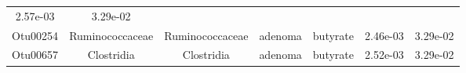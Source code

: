 \documentclass[11pt,]{article}
\begin{document}
\begin{longtable}[]{@{}ccccccc@{}}
\begin{minipage}[t]{0.09\columnwidth}
2.57e-03\strut
\end{minipage} & \begin{minipage}[t]{0.09\columnwidth}\centering\strut
3.29e-02\strut
\end{minipage}\tabularnewline
\begin{minipage}[t]{0.09\columnwidth}\centering\strut
Otu00254\strut
\end{minipage} & \begin{minipage}[t]{0.17\columnwidth}\centering\strut
Ruminococcaceae\strut
\end{minipage} & \begin{minipage}[t]{0.17\columnwidth}\centering\strut
Ruminococcaceae\strut
\end{minipage} & \begin{minipage}[t]{0.09\columnwidth}\centering\strut
adenoma\strut
\end{minipage} & \begin{minipage}[t]{0.11\columnwidth}\centering\strut
butyrate\strut
\end{minipage} & \begin{minipage}[t]{0.09\columnwidth}\centering\strut
2.46e-03\strut
\end{minipage} & \begin{minipage}[t]{0.09\columnwidth}\centering\strut
3.29e-02\strut
\end{minipage}\tabularnewline
\begin{minipage}[t]{0.09\columnwidth}\centering\strut
Otu00657\strut
\end{minipage} & \begin{minipage}[t]{0.17\columnwidth}\centering\strut
Clostridia\strut
\end{minipage} & \begin{minipage}[t]{0.17\columnwidth}\centering\strut
Clostridia\strut
\end{minipage} & \begin{minipage}[t]{0.09\columnwidth}\centering\strut
adenoma\strut
\end{minipage} & \begin{minipage}[t]{0.11\columnwidth}\centering\strut
butyrate\strut
\end{minipage} & \begin{minipage}[t]{0.09\columnwidth}\centering\strut
2.52e-03\strut
\end{minipage} & \begin{minipage}[t]{0.09\columnwidth}\centering\strut
3.29e-02\strut
\end{minipage}\tabularnewline

\end{longtable}
\end{document}
